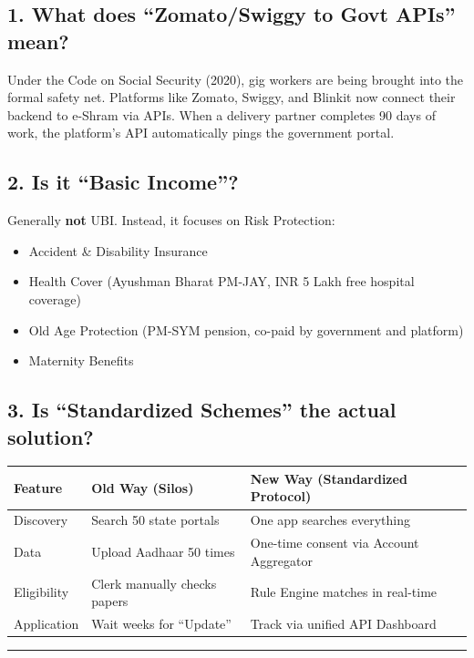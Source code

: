 \documentclass[11pt,a4paper]{article}
\begin{document}
\subsection*{1. What does ``Zomato/Swiggy to Govt APIs'' mean?}
Under the Code on Social Security (2020), gig workers are being brought into the formal safety net. Platforms like Zomato, Swiggy, and Blinkit now connect their backend to e-Shram via APIs. When a delivery partner completes 90 days of work, the platform's API automatically pings the government portal.

\subsection*{2. Is it ``Basic Income''?}
Generally \textbf{not} UBI. Instead, it focuses on Risk Protection:
\begin{itemize}[nosep]
\item Accident \& Disability Insurance
\item Health Cover (Ayushman Bharat PM-JAY, INR 5 Lakh free hospital coverage)
\item Old Age Protection (PM-SYM pension, co-paid by government and platform)
\item Maternity Benefits
\end{itemize}

\subsection*{3. Is ``Standardized Schemes'' the actual solution?}

\begin{tabularx}{\textwidth}{@{}lXX@{}}
\toprule
\textbf{Feature} & \textbf{Old Way (Silos)} & \textbf{New Way (Standardized Protocol)} \\
\midrule
Discovery & Search 50 state portals & One app searches everything \\
Data & Upload Aadhaar 50 times & One-time consent via Account Aggregator \\
Eligibility & Clerk manually checks papers & Rule Engine matches in real-time \\
Application & Wait weeks for ``Update'' & Track via unified API Dashboard \\
\bottomrule
\end{tabularx}

\bigskip
\hrule
\bigskip

\end{document}
